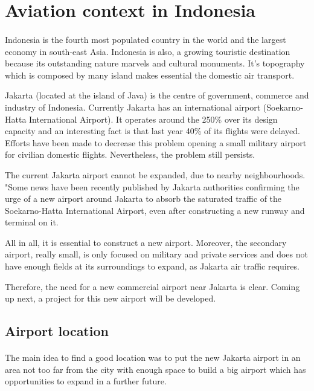 \section{Aviation context in Indonesia}
\paragraph{} Indonesia is the fourth most populated country in the world and the largest economy in south-east Asia. Indonesia is also, a growing touristic destination because its outstanding nature marvels and cultural monuments. It’s topography which is composed by many island makes essential the domestic air transport.

Jakarta (located at the island of Java) is the centre of government, commerce and industry of Indonesia. Currently Jakarta has an international airport (Soekarno-Hatta International Airport). It operates around the 250\% over its design capacity and an interesting fact is that last year 40\% of its flights were delayed. Efforts have been made to decrease this problem opening a small military airport for civilian domestic flights. Nevertheless, the problem still persists. 

The current Jakarta airport cannot be expanded, due to nearby neighbourhoods. "Some news have been recently published by Jakarta authorities confirming the urge of a new airport around Jakarta to absorb the saturated traffic of the Soekarno-Hatta International Airport, even after constructing a new runway and terminal on it. 

All in all, it is essential to construct a new airport. Moreover, the secondary airport, really small, is only focused on military and private services and does not have enough fields at its surroundings to expand, as Jakarta air traffic requires. 

Therefore, the need for a new commercial airport near Jakarta is clear. Coming up next, a project for this new airport will be developed.

\clearpage

	\subsection{Airport location}
\paragraph{}The main idea to find a good location was to put the new Jakarta airport in an area not too far from the city with enough space to build a big airport which has opportunities to expand in a further future.

